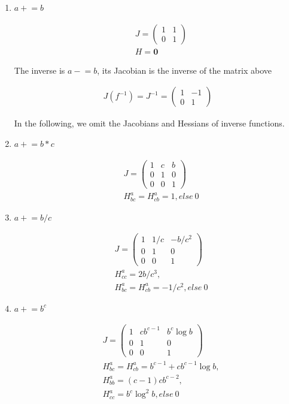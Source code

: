 \documentclass[aps,twocolumn,longbibliography,english,superscriptaddress]{revtex4-1}
\newcommand{\<}{\langle}
\renewcommand{\>}{\rangle}
\theoremstyle{definition}\newtheorem{definition}{\textit{Definition}}
\begin{document}
\begin{enumerate}
    \item $a \mathrel+= b$

\begin{align*}
    &J = \left(\begin{matrix}
1 & 1\\
0 & 1
\end{matrix}\right)\\
    &H = \mathbf{0}
\end{align*}

The inverse is $a \mathrel-= b$, its Jacobian is the inverse of the matrix above

\begin{align*}
J(f^{-1}) = J^{-1} = \left(\begin{matrix}
1 & -1\\
0 & 1
\end{matrix}\right)
\end{align*}

In the following, we omit the Jacobians and Hessians of inverse functions.

\item $a\mathrel+=b*c$

\begin{align*}
    &J = \left(\begin{matrix}
1 & c & b\\
0 & 1 & 0\\
0 & 0 & 1
\end{matrix}\right)\\
    &H^a_{bc} = H^a_{cb} = 1, else ~0
\end{align*}

\item $a\mathrel+=b/c$

\begin{align*}
    &J = \left(\begin{matrix}
1 & 1/c &-b/c^2\\
0 & 1 & 0\\
0 & 0 & 1
\end{matrix}\right)\\
    &H^a_{cc} = 2b/c^3,\\
    &H^a_{bc} = H^a_{cb} = -1/c^2, else ~ 0
\end{align*}

\item $a\mathrel+=b^c$


\begin{align*}
    &J = \left(\begin{matrix}
1 &  cb^{c-1} &   b^c \log b \\
0 & 1 & 0\\
0 & 0 & 1
\end{matrix}\right)\\
    &H^a_{bc} = H^a_{cb} = b^{c-1} + c b^{c-1}\log b,\\
    &H^a_{bb} = (c-1)c b^{c-2},\\
    &H^a_{cc} = b^c\log^2b, else ~0
\end{align*}


\end{enumerate}
\end{document}

